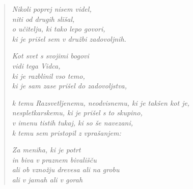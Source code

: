 \begin{verse}


\emph{Nikoli poprej nisem videl,}\\
\emph{niti od drugih slišal,}\\
\emph{o učitelju, ki tako lepo govori,}\\
\emph{ki je prišel sem v družbi zadovoljnih.}

\emph{Kot svet s svojimi bogovi}\\
\emph{vidi tega Vidca,}\\
\emph{ki je razblinil vso temo,}\\
\emph{ki je sam zase prišel do zadovoljstva,}

\emph{k temu Razsvetljenemu, neodvisnemu, ki je takšen kot je,}\\
\emph{nespletkarskemu, ki je prišel s to skupino,}\\
\emph{v imenu tistih tukaj, ki so še navezani,}\\
\emph{k temu sem pristopil z vprašanjem:}

\emph{Za meniha, ki je potrt}\\
\emph{in biva v praznem bivališču}\\
\emph{ali ob vznožju drevesa ali na grobu}\\
\emph{ali v jamah ali v gorah}

\end{verse}


